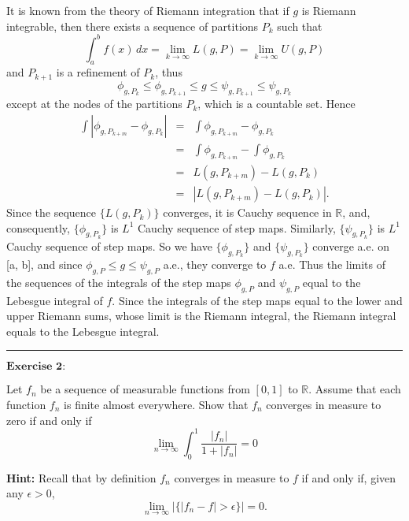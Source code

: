\documentclass[12pt,a4paper]{ctexart}
\begin{document}
It is known from the theory of Riemann integration that if $g$ is Riemann integrable, then there exists a sequence of partitions $P_{k}$ such that
\begin{equation*}
    \int_{a}^{b} f(x) \, d x = \lim_{k \to \infty} L(g, P) = \lim_{k \to \infty} U(g, P)
\end{equation*}
and $P_{k+1}$ is a refinement of $P_{k}$, thus
\begin{equation*}
    \phi_{g, P_{k}} \leq \phi_{g, P_{k+1}}  \leq g \leq \psi_{g, P_{k+1}} \leq \psi_{g, P_{k}} 
\end{equation*}
except at the nodes of the partitions $P_{k}$, which is a countable set. Hence
\begin{eqnarray*}
    \int |\phi_{g, P_{k+m}} - \phi_{g, P_{k}} | & = & \int \phi_{g, P_{k+m}} - \phi_{g, P_{k}}   \\
    & = & \int \phi_{g, P_{k+m}} - \int \phi_{g, P_{k}}  \\
    & = & L(g, P_{k+m}) - L(g, P_{k}) \\
    & = & |L(g, P_{k+m}) - L(g, P_{k})|.
\end{eqnarray*}
Since the sequence $\{ L (g, P_{k}) \}$ converges, it is Cauchy sequence in $\mathbb{R}$, and, consequently, $\{\phi_{g, P_{k}} \}$ is $L^{1}$ Cauchy sequence of step maps. Similarly,  $\{\psi_{g, P_{k}} \}$ is $L^{1}$ Cauchy sequence of step maps. So we have $\{\phi_{g, P_{k}} \}$ and $\{\psi_{g, P_{k}} \}$ converge a.e. on [a, b], and since $\phi_{g, P} \leq g \leq \psi_{g, P}$ a.e., they converge to $f$ a.e. Thus the limits of the sequences of the integrals of the step maps $\phi_{g, P}$ and $\psi_{g, P}$ equal to the Lebesgue integral of $f$. Since the integrals of the step maps equal to the lower and upper Riemann sums, whose limit is the Riemann integral, the Riemann integral equals to the Lebesgue integral.


\noindent\rule[0.25\baselineskip]{\textwidth}{0.5pt}

\vspace{8pt}
$\textbf{Exercise 2:}$

Let $f_{n}$ be a sequence of measurable functions from $[0, 1]$ to $\mathbb{R}$. Assume that each function $f_{n}$ is finite almost everywhere. Show that $f_{n}$ converges in measure to zero if and only if 
\begin{equation*}
    \lim_{n \to \infty} \int_{0}^{1} \frac{|f_{n}|}{1 + |f_{n}|} = 0
\end{equation*}

\textbf{Hint:} Recall that by definition $f_{n}$ converges in measure to $f$ if and only if, given any $\epsilon > 0$,
\begin{equation*}
    \lim_{n \to \infty} |\{ |f_{n} - f| > \epsilon \}| = 0.
\end{equation*}
\end{document}
